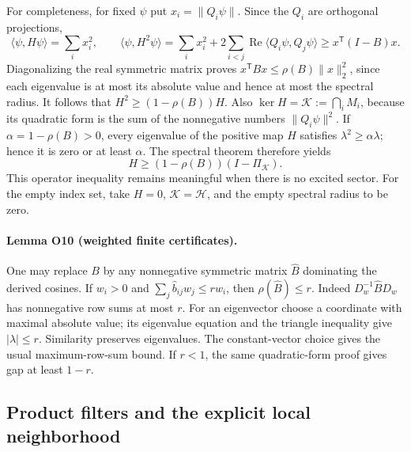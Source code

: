 For completeness, for fixed $\psi$ put $x_i=\|Q_i\psi\|$.
Since the $Q_i$ are orthogonal projections,
\[
 \langle\psi,H\psi\rangle=\sum_i x_i^2,\qquad
 \langle\psi,H^2\psi\rangle
 =\sum_i x_i^2+2\sum_{i<j}
 \operatorname{Re}\langle Q_i\psi,Q_j\psi\rangle
 \geq x^{\mathsf T}(I-B)x.
\]
Diagonalizing the real symmetric matrix proves
$x^{\mathsf T}Bx\leq\rho(B)\|x\|_2^2$, since each eigenvalue is at most
its absolute value and hence at most the spectral radius.
It follows that $H^2\geq(1-\rho(B))H$.
Also $\ker H=\mathcal K:=\bigcap_iM_i$, because its quadratic form is
the sum of the nonnegative numbers $\|Q_i\psi\|^2$.
If $\alpha=1-\rho(B)>0$, every eigenvalue of the positive map $H$
satisfies $\lambda^2\geq\alpha\lambda$; hence it is zero or at least
$\alpha$. The spectral theorem therefore yields
\[
 H\geq(1-\rho(B))(I-\Pi_{\mathcal K}).
\]
This operator inequality remains meaningful when there is no excited
sector. For the empty index set, take $H=0$, $\mathcal K=\mathcal H$,
and the empty spectral radius to be zero.

\paragraph{Lemma O10 (weighted finite certificates).}
One may replace $B$ by any nonnegative symmetric matrix $\widehat B$
dominating the derived cosines. If $w_i>0$ and
$\sum_j\widehat b_{ij}w_j\leq rw_i$, then
$\rho(\widehat B)\leq r$.
Indeed $D_w^{-1}\widehat B D_w$ has nonnegative row sums at most $r$.
For an eigenvector choose a coordinate with maximal absolute value;
its eigenvalue equation and the triangle inequality give
$|\lambda|\leq r$. Similarity preserves eigenvalues.
The constant-vector choice gives the usual maximum-row-sum bound.
If $r<1$, the same quadratic-form proof gives gap at least $1-r$.

\subsection{Product filters and the explicit local neighborhood}

